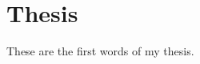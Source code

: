 \documentclass[pdftex,12pt,a4paper]{report}
\begin{document}


\section{Thesis}
These are the first words of my thesis.
\end{document}
